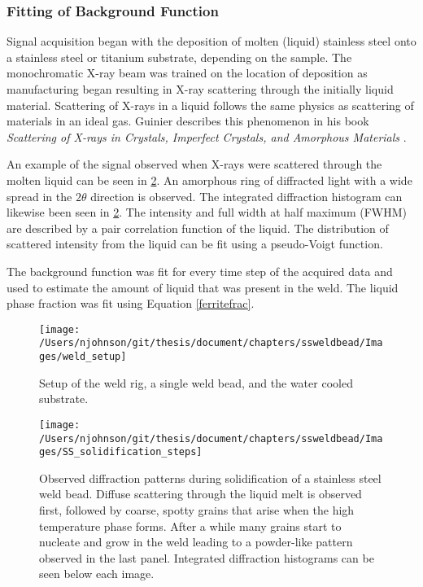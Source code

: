 \subsubsection{Fitting of Background Function}
Signal acquisition began with the deposition of molten (liquid) stainless steel onto a stainless steel or titanium substrate, depending on the sample. The monochromatic X-ray beam was trained on the location of deposition as manufacturing began resulting in X-ray scattering through the initially liquid material. Scattering of X-rays in a liquid follows the same physics as scattering of materials in an ideal gas. Guinier describes this phenomenon in his book \textit{Scattering of X-rays in Crystals, Imperfect Crystals, and Amorphous Materials} \cite{Guinier1994}. 

An example of the signal observed when X-rays were scattered through the molten liquid can be seen in \ref{solidification_steps}. An amorphous ring of diffracted light with a wide spread in the $2\theta$ direction is observed. The integrated diffraction histogram can likewise been seen in \ref{solidification_steps}. The intensity and full width at half maximum (FWHM) are described by a pair correlation function of the liquid. The distribution of scattered intensity from the liquid can be fit using a pseudo-Voigt function. 

The background function was fit for every time step of the acquired data and used to estimate the amount of liquid that was present in the weld. The liquid phase fraction was fit using Equation \ref{ferritefrac}.

\begin{figure}
	\texttt{[image: /Users/njohnson/git/thesis/document/chapters/ssweldbead/Images/weld\_setup]}
	\caption{Setup of the weld rig, a single weld bead, and the water cooled substrate.}
	\label{weld_setup}
\end{figure}

\begin{figure}
	\texttt{[image: /Users/njohnson/git/thesis/document/chapters/ssweldbead/Images/SS\_solidification\_steps]}
	\caption{Observed diffraction patterns during solidification of a stainless steel weld bead. Diffuse scattering through the liquid melt is observed first, followed by coarse, spotty grains that arise when the high temperature phase forms. After a while many grains start to nucleate and grow in the weld leading to a powder-like pattern observed in the last panel. Integrated diffraction histograms can be seen below each image.}
	\label{solidification_steps}
\end{figure}


